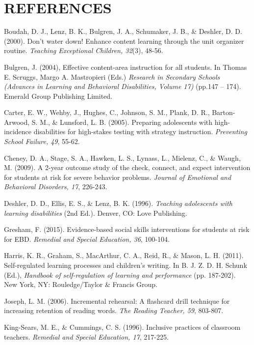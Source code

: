 \documentclass[11.5pt]{sig-alternate} %
\begin{document}
\section*{REFERENCES}\par 

\leftskip 0.25in
\parindent -0.25in 

Boudah, D. J., Lenz, B. K., Bulgren, J. A., Schumaker, J. B., \& Deshler, D. D. (2000). Don't water down! Enhance content learning through the unit organizer routine. \textit{Teaching Exceptional Children, 32}(3), 48-56.

Bulgren, J. (2004), Effective content-area instruction for all students. In Thomas E. Scruggs, Margo A. Mastropieri (Eds.) \textit{Research in Secondary Schools (Advances in Learning and Behavioral Disabilities, Volume 17)} (pp.147 – 174). Emerald Group Publishing Limited.

Carter, E. W., Wehby, J., Hughes, C., Johnson, S. M., Plank, D. R., Barton-Arwood, S. M., \& Lunsford, L. B. (2005). Preparing adolescents with high-incidence disabilities for high-stakes testing with strategy instruction. \textit{Preventing School Failure, 49}, 55-62.

Cheney, D. A., Stage, S. A., Hawken, L. S., Lynass, L., Mielenz, C., \& Waugh, M. (2009). A 2-year outcome study of the check, connect, and expect intervention for students at risk for severe behavior problems. \textit{Journal of Emotional and Behavioral Disorders, 17}, 226-243.

Deshler, D. D., Ellis, E. S., \& Lenz, B. K. (1996). \textit{Teaching adolescents with learning disabilities} (2nd Ed.). Denver, CO: Love Publishing.

Gresham, F. (2015). Evidence-based social skills interventions for students at risk for EBD. \textit{Remedial and Special Education, 36}, 100-104.

Harris, K. R., Graham, S., MacArthur, C. A., Reid, R., \& Mason, L. H. (2011). Self-regulated learning processes and children’s writing. In B. J. Z. D. H. Schunk (Ed.), \textit{Handbook of self-regulation of learning and performance} (pp. 187-202). New York, NY: Rouledge/Taylor \& Francis Group. 

Joseph, L. M. (2006). Incremental rehearsal: A flashcard drill technique for increasing retention of reading words. \textit{The Reading Teacher, 59}, 803-807.	

King-Sears, M. E., \& Cummings, C. S. (1996). Inclusive practices of classroom teachers. \textit{Remedial and Special Education, 17}, 217-225.
\end{document}
